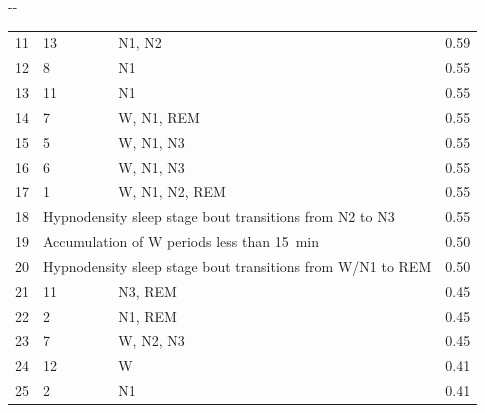 \begin{table}[h]
\begin{adjustwidth*}{}{-\marginparwidth-\marginparsep}
\begin{tabular}{@{}lp{4.5cm}lr@{}}
        11 & 13                                                     & \ac{N1}, \ac{N2}                      & 0.59                         \\
        12 & 8                                                      & \ac{N1}                               & 0.55                         \\
        13 & 11                                                     & \ac{N1}                               & 0.55                         \\
        14 & 7                                                      & \ac{W}, \ac{N1}, \ac{REM}             & 0.55                         \\
        15 & 5                                                      & \ac{W}, \ac{N1}, \ac{N3}              & 0.55                         \\
        16 & 6                                                      & \ac{W}, \ac{N1}, \ac{N3}              & 0.55                         \\
        17 & 1                                                      & \ac{W}, \ac{N1}, \ac{N2}, \ac{REM}    & 0.55                         \\
        18 & \multicolumn{2}{l}{Hypnodensity sleep stage bout transitions from \ac{N2} to \ac{N3}}          & 0.55                         \\
        19 & \multicolumn{2}{l}{Accumulation of \ac{W} periods less than \SI{15}{\minute}}                  & 0.50                         \\
        20 & \multicolumn{2}{l}{Hypnodensity sleep stage bout transitions from \ac{W}/\ac{N1} to \ac{REM}}  & 0.50                         \\
        21 & 11                                                     & \ac{N3}, \ac{REM}                     & 0.45                         \\
        22 & 2                                                      & \ac{N1}, \ac{REM}                     & 0.45                         \\
        23 & 7                                                      & \ac{W}, \ac{N2}, \ac{N3}              & 0.45                         \\
        24 & 12                                                     & \ac{W}                                & 0.41                         \\
        25 & 2                                                      & \ac{N1}                               & 0.41                         \\

\end{tabular}
\end{adjustwidth*}
\end{table}
